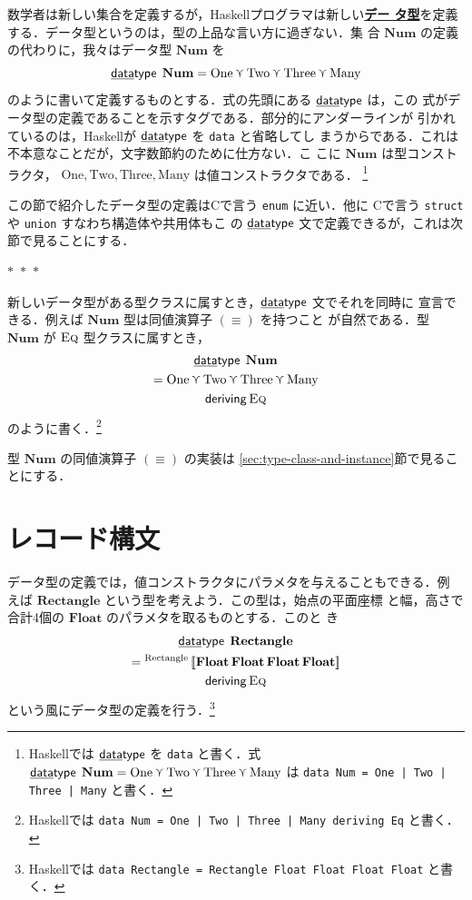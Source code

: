 \documentclass[a5paper,twoside,fleqn]{jsbook}
\def\[{\left[\!\left[}
\def\]{\right]\!\right]}
\newcommand{\separator}{\begin{center}$*$~$*$~$*$\end{center}}
\newcommand{\programminglanguage}[1]{\textsf{#1}}
\newcommand{\clang}{\programminglanguage{C}}
\newcommand{\haskell}{\programminglanguage{Haskell}}
\newcommand{\keyword}[1]{{\underline{\textbf{#1}}}}
\newcommand{\code}[1]{\texttt{#1}}
\newcommand{\mKeyword}[1]{\mathsf{#1}} %
\newcommand{\mKeywordUnderline}[1]{\text{\underline{\textsf{#1}}}} %
\newcommand{\mDataTypeKeyword}{\mKeywordUnderline{data}\mKeyword{type}}
\newcommand{\mDerivingKeyword}{\mKeyword{deriving}}
\DeclareMathOperator{\mDataType}{\mDataTypeKeyword}
\DeclareMathOperator{\mDeriving}{\mDerivingKeyword}
\newcommand{\mSpecialConstant}[1]{\textrm{#1}} %
\newcommand{\mNumOne}{\mSpecialConstant{One}}
\newcommand{\mNumTwo}{\mSpecialConstant{Two}}
\newcommand{\mNumThree}{\mSpecialConstant{Three}}
\newcommand{\mNumMany}{\mSpecialConstant{Many}}
\DeclareMathOperator{\mValueOr}{\curlyvee}
\newcommand{\mSet}[1]{\mathbf{#1}}
\newcommand{\mType}[1]{\mathbf{#1}}
\newcommand{\mFloatType}{\mType{Float}}
\newcommand{\mGenericValueConstructor}[1]{\mathrm{#1}}
\newcommand{\mGenericWith}[2]{{}^\mGenericValueConstructor{#1}\[#2\]}
\newcommand{\mGenericTypeClass}[1]{\textsc{#1}} %
\newcommand{\mEqTypeClass}{\mGenericTypeClass{Eq}}
\begin{document}
数学者は新しい集合を定義するが，\haskell プログラマは新しい\keyword{デー
  タ型}を定義する．データ型というのは，型の上品な言い方に過ぎない．集
合 $\mSet{Num}$ の定義の代わりに，我々はデータ型 $\mType{Num}$ を
\begin{equation}
\mDataType\;\mType{Num}
=\mNumOne\mValueOr\mNumTwo\mValueOr\mNumThree\mValueOr\mNumMany
\end{equation}
のように書いて定義するものとする．式の先頭にある $\mDataType$ は，この
式がデータ型の定義であることを示すタグである．部分的にアンダーラインが
引かれているのは，\haskell が $\mDataType$ を \code{data} と省略してし
まうからである．これは不本意なことだが，文字数節約のために仕方ない．こ
こに $\mSet{Num}$ は型コンストラクタ，
$\mNumOne,\mNumTwo,\mNumThree,\mNumMany$ は値コンストラクタである．
\footnote{\haskell では $\mDataType$ を \code{data} と書く．式
$\mDataType\;\mType{Num}
=\mNumOne\mValueOr\mNumTwo\mValueOr\mNumThree\mValueOr\mNumMany$ は
\code{data Num = One | Two | Three | Many} と書く．}

この節で紹介したデータ型の定義は\clang で言う \code{enum} に近い．他に
\clang で言う \code{struct} や \code{union} すなわち構造体や共用体もこ
の $\mDataType$ 文で定義できるが，これは次節で見ることにする．

\separator

新しいデータ型がある型クラスに属すとき，$\mDataType$ 文でそれを同時に
宣言できる．例えば $\mType{Num}$ 型は同値演算子 $(\equiv)$ を持つこと
が自然である．型 $\mType{Num}$ が $\mEqTypeClass$ 型クラスに属すとき，
\begin{multline}
\mDataType\;\mType{Num}\\
=\mNumOne\mValueOr\mNumTwo\mValueOr\mNumThree\mValueOr\mNumMany\\
\mDeriving\mEqTypeClass
\end{multline}
のように書く．\footnote{\haskell では \code{data Num = One | Two |
Three | Many deriving Eq} と書く．}

型 $\mType{Num}$ の同値演算子 $(\equiv)$ の実装は
\ref{sec:type-class-and-instance}節で見ることにする．

\section{レコード構文}

データ型の定義では，値コンストラクタにパラメタを与えることもできる．例
えば $\mType{Rectangle}$ という型を考えよう．この型は，始点の平面座標
と幅，高さで合計4個の $\mFloatType$ のパラメタを取るものとする．このと
き
\begin{multline}
\label{eq:rectangle}
\mDataType\;\mType{Rectangle}\\
=\mGenericWith{Rectangle}{\mFloatType\,\mFloatType\,
  \mFloatType\,\mFloatType}\\
\mDeriving\mEqTypeClass
\end{multline}
という風にデータ型の定義を行う．\footnote{\haskell では \code{data
Rectangle = Rectangle Float Float Float Float} と書く．}
\end{document}

